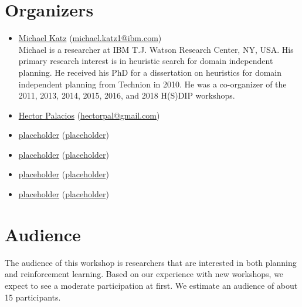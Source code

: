 \documentclass[10pt]{article}
\begin{document}
\section*{Organizers}

\begin{itemize}



\item \href{https://resedit.watson.ibm.com/researcher/view.php?person=ibm-Michael.Katz1}{Michael Katz}
 (\href{mailto:michael.katz1@ibm.com}{michael.katz1@ibm.com})\\
 Michael is a researcher at IBM T.J. Watson Research Center, NY, USA. His
 primary research interest is in heuristic search for domain independent planning.
 He received his PhD for a dissertation on heuristics for domain independent
 planning from Technion in 2010.
 He was a co-organizer of the 2011, 2013, 2014, 2015, 2016, and 2018 H(S)DIP
 workshops.


\item \href{http://hectorpalacios.net/}{Hector Palacios}
  (\href{mailto:hectorpal@gmail.com}{hectorpal@gmail.com})\\

\item \href{placeholder}{placeholder}
  (\href{mailto:placeholder}{placeholder})\\

\item \href{placeholder}{placeholder}
  (\href{mailto:placeholder}{placeholder})\\

\item \href{placeholder}{placeholder}
  (\href{mailto:placeholder}{placeholder})\\

\item \href{placeholder}{placeholder}
  (\href{mailto:placeholder}{placeholder})\\

  
\end{itemize}

\section*{Audience}

The audience of this workshop is researchers that are interested in both
planning and reinforcement learning.
%
Based on our experience with new workshops, we expect to see a moderate
participation at first. We estimate an audience of about 15 participants.  
\end{document}
